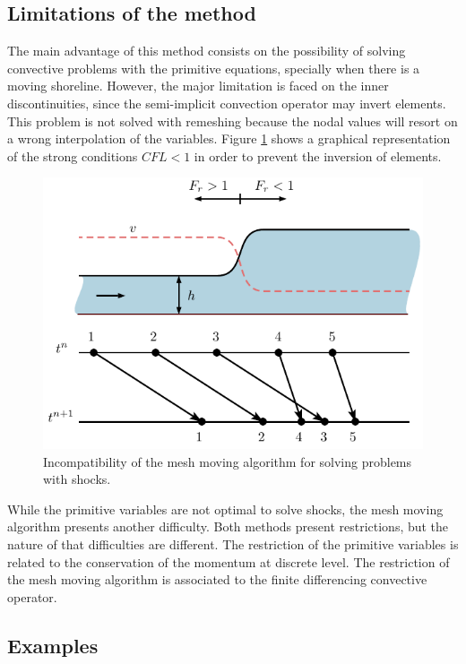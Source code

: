 \subsection{Limitations of the method}

The main advantage of this method consists on the possibility of solving convective problems with the primitive equations, specially when there is a moving shoreline. However, the major limitation is faced on the inner discontinuities, since the semi-implicit convection operator may invert elements. This problem is not solved with remeshing because the nodal values will resort on a wrong interpolation of the variables. Figure \ref{pfem_shock} shows a graphical representation of the strong conditions $CFL<1$ in order to prevent the inversion of elements.

\begin{figure} [htb]
    \centering
    \includegraphics[width=.8\textwidth]{img/lagrangian/pfem_shock.pdf}
    \caption{Incompatibility of the mesh moving algorithm for solving problems with shocks.}
    \label{pfem_shock}
\end{figure}

While the primitive variables are not optimal to solve shocks, the mesh moving algorithm presents another difficulty.
Both methods present restrictions, but the nature of that difficulties are different. The restriction of the primitive variables is related to the conservation of the momentum at discrete level. The restriction of the mesh moving algorithm is associated to the finite differencing convective operator.



\subsection{Examples}





